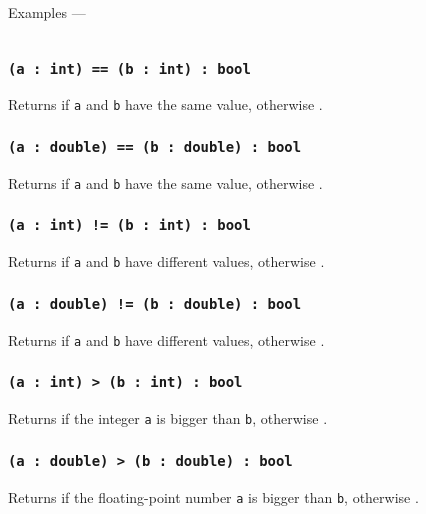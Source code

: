 Examples —
\inputminted[linenos]{icl}{../sources/numberopex.icL}

\subsubsection{\texttt{(a : int) == (b : int) : bool}}

Returns \true{} if \texttt{a} and \texttt{b} have the same value, otherwise \false{}.

\subsubsection{\texttt{(a : double) == (b : double) : bool}}

Returns \true{} if \texttt{a} and \texttt{b} have the same value, otherwise \false{}.

\subsubsection{\texttt{(a : int) != (b : int) : bool}}

Returns \true{} if \texttt{a} and \texttt{b} have different values, otherwise \false{}.

\subsubsection{\texttt{(a : double) != (b : double) : bool}}

Returns \true{} if \texttt{a} and \texttt{b} have different values, otherwise \false{}.

\subsubsection{\texttt{(a : int) > (b : int) : bool}}

Returns \true{} if the integer \texttt{a} is bigger than \texttt{b}, otherwise \false{}.

\subsubsection{\texttt{(a : double) > (b : double) : bool}}

Returns \true{} if the floating-point number \texttt{a} is bigger than \texttt{b}, otherwise \false{}.

